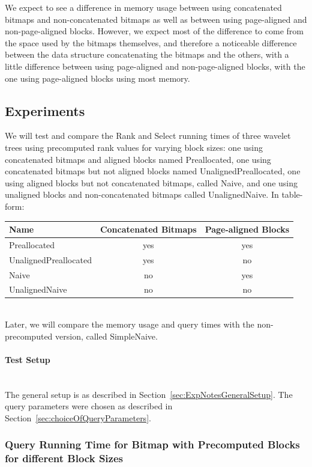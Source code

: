 We expect to see a difference in memory usage between using concatenated bitmaps and non-concatenated bitmaps as well as between using page-aligned and non-page-aligned blocks.
However, we expect most of the difference to come from the space used by the bitmaps themselves, and therefore a noticeable difference between the data structure concatenating the bitmaps and the others, with a little difference between using page-aligned and non-page-aligned blocks, with the one using page-aligned blocks using most memory.



\subsection{Experiments}
We will test and compare the Rank and Select running times of three wavelet trees using precomputed rank values for varying block sizes: one using concatenated bitmaps and aligned blocks named Preallocated, one using concatenated bitmaps but not aligned blocks named UnalignedPreallocated, one using aligned blocks but not concatenated bitmaps, called Naive,
and one using unaligned blocks and non-concatenated bitmaps called UnalignedNaive.
In table-form:\\
\begin{tabular}{|lcc|}
\hline
Name						& Concatenated Bitmaps	& Page-aligned Blocks	\\ \hline
Preallocated				& yes					& yes					\\ \hline
UnalignedPreallocated	& yes					& no						\\ \hline
Naive					& no						& yes					\\ \hline
UnalignedNaive			& no						& no						\\ \hline
\end{tabular}\\
Later, we will compare the memory usage and query times with the non-precomputed version, called SimpleNaive.

\paragraph{Test Setup}~\\
The general setup is as described in Section~\ref{sec:ExpNotesGeneralSetup}.
The query parameters were chosen as described in Section~\ref{sec:choiceOfQueryParameters}.

\subsubsection{Query Running Time for Bitmap with Precomputed Blocks for different Block Sizes}
\label{sec:queryRunTimePrecomputedBlockSizes}

